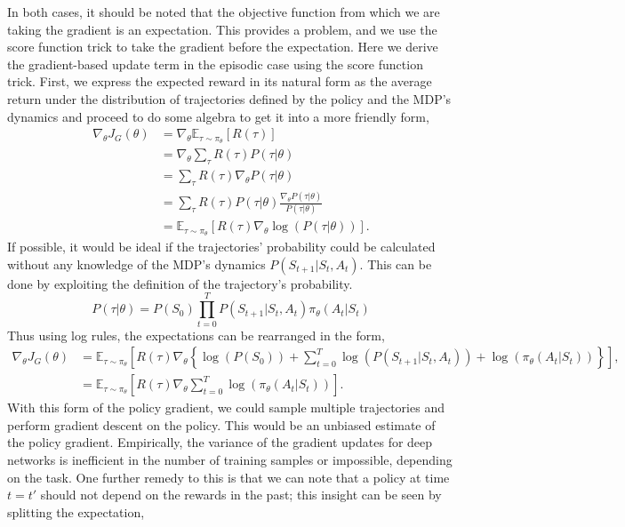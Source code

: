 In both cases, it should be noted that the objective function from which we are taking the gradient is an expectation. This provides a problem, and we use the score function trick to take the gradient before the expectation.
Here we derive the gradient-based update term in the episodic case using the score function trick. First, we express the expected reward in its natural form as the average return under the distribution of trajectories defined by the policy and the MDP's dynamics and proceed to do some algebra to get it into a more friendly form,
\begin{align}
	\nabla_\theta J_G(\theta) & = \nabla_\theta \mathbb{E}_{\tau \sim \pi_\theta}\left[R(\tau)\right]                            \\
	                          & = \nabla_\theta \sum_\tau R(\tau) P(\tau|\theta)                                                 \\
	                          & = \sum_\tau R(\tau) \nabla_\theta P(\tau | \theta)                                               \\
	                          & = \sum_\tau R(\tau) P(\tau | \theta) \frac{\nabla_\theta P(\tau | \theta)}{P(\tau |\theta)}      \\
	                          & = \mathbb{E}_{\tau \sim \pi_{\theta}} \left[ R(\tau) \nabla_\theta \log(P(\tau| \theta))\right].
\end{align}
If possible, it would be ideal if the trajectories' probability could be calculated without any knowledge of the MDP's dynamics $P(S_{t+1}| S_t, A_t)$. This can be done by exploiting the definition of the trajectory's probability.
\begin{equation}
	P(\tau|\theta) = P(S_0) \prod_{t=0}^ TP(S_{t+1}| S_t, A_t)\pi_\theta(A_{t}|S_{t})
\end{equation}
Thus using log rules, the expectations can be rearranged in the form,
\begin{align}
	\nabla_\theta J_G(\theta) & = \mathbb{E}_{\tau \sim \pi_{\theta}} \left[ R(\tau) \nabla_\theta \left\{ \log(P(S_0)) +  \sum_{t=0}^ T \log(P(S_{t+1}| S_t, A_t))+ \log(\pi_\theta(A_t|S_t))\right\} \right], \\
	                          & = \mathbb{E}_{\tau \sim \pi_{\theta}} \left[ R(\tau) \nabla_\theta \sum_{t=0}^ T \log(\pi_\theta(A_t|S_t))\right].
\end{align}
With this form of the policy gradient, we could sample multiple trajectories and perform gradient descent on the policy. This would be an unbiased estimate of the policy gradient. Empirically, the variance of the gradient updates for deep networks is inefficient in the number of training samples or impossible, depending on the task. One further remedy to this is that we can note that a policy at time $t = t'$ should not depend on the rewards in the past; this insight can be seen by splitting the expectation,
